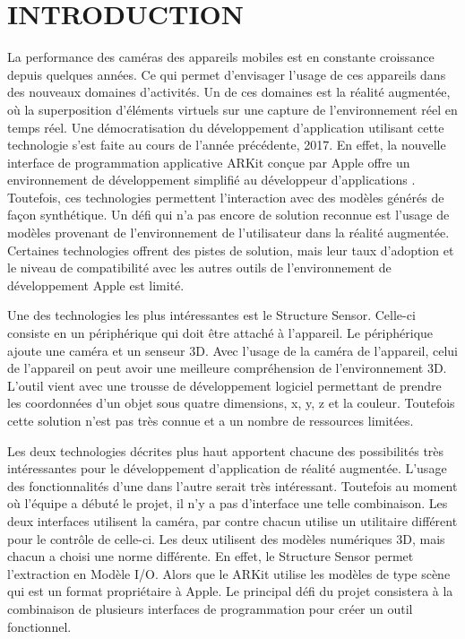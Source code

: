 \documentclass[rapport.tex]{subfiles}
\begin{document}
\chapter*{\uppercase{Introduction}}
La performance des caméras des appareils mobiles est en constante croissance depuis quelques années. Ce qui permet d’envisager l’usage de ces appareils dans des nouveaux domaines d’activités. Un de ces domaines est la réalité augmentée, où la superposition d’éléments virtuels sur une capture de l’environnement réel en temps réel. Une démocratisation du développement d’application utilisant cette technologie s’est faite au cours de l’année précédente, 2017. En effet, la nouvelle interface de programmation applicative ARKit conçue par Apple offre un environnement de développement simplifié au développeur d’applications \citep*{StattN2017}. Toutefois, ces technologies permettent l’interaction avec des modèles générés de façon synthétique. Un défi qui n’a pas encore de solution reconnue est l’usage de modèles provenant de l’environnement de l’utilisateur dans la réalité augmentée. Certaines technologies offrent des pistes de solution, mais leur taux d’adoption et le niveau de compatibilité avec les autres outils de l’environnement de développement Apple est limité.
\par
Une des technologies les plus intéressantes est le Structure Sensor\citep*{molitchHou01}. Celle-ci consiste en un périphérique qui doit être attaché à l’appareil. Le périphérique ajoute une caméra et un senseur 3D. Avec l’usage de la caméra de l’appareil, celui de l’appareil on peut avoir une meilleure compréhension de l’environnement 3D. L’outil vient avec une trousse de développement logiciel permettant de prendre les coordonnées d’un objet sous quatre dimensions, x, y, z et la couleur. Toutefois cette solution n’est pas très connue et a un nombre de ressources limitées.
\par
Les deux technologies décrites plus haut apportent chacune des possibilités très intéressantes pour le développement d’application de réalité augmentée. L’usage des fonctionnalités d’une dans l’autre serait très intéressant. Toutefois au moment où l’équipe a débuté le projet, il n’y a pas d’interface une telle combinaison. Les deux interfaces utilisent la caméra, par contre chacun utilise un utilitaire différent pour le contrôle de celle-ci. Les deux utilisent des modèles numériques 3D, mais chacun a choisi une norme différente. En effet, le Structure Sensor permet l’extraction en Modèle I/O. Alors que le ARKit utilise les modèles de type scène qui est un format propriétaire à Apple. Le principal défi du projet consistera à la combinaison de plusieurs interfaces de programmation pour créer un outil fonctionnel.
\end{document}
